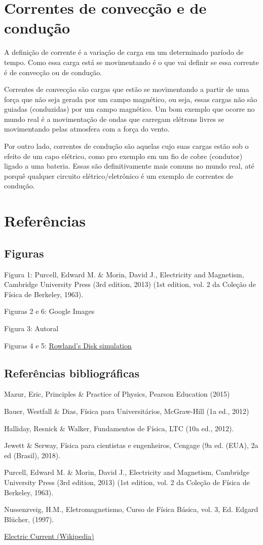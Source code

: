 \documentclass[12pt, letterpaper]{article}
\begin{document}
\newpage
\section{Correntes de convecção e de condução}
    A definição de corrente é a variação de carga em um determinado paríodo de tempo. Como essa carga está se movimentando é o que vai definir se essa corrente é de convecção ou de condução.

    Correntes de convecção são cargas que estão se movimentando a partir de uma força que não seja gerada por um campo magnético, ou seja, essas cargas não são guiadas (conduzidas) por um campo magnético. Um bom exemplo que ocorre no mundo real é a movimentação de ondas que carregam elétrons livres se movimentando pelas atmosfera com a força do vento.

    Por outro lado, correntes de condução são aquelas cujo suas cargas estão sob o efeito de um capo elétrico, como pro exemplo em um fio de cobre (condutor) ligado a uma bateria. Essas são definitivamente mais comuns no mundo real, até porquê qualquer circuito elétrico/eletrônico é um exemplo de correntes de condução.

\newpage
\section{Referências}
    \subsection{Figuras}
    Figura 1: Purcell, Edward M. \& Morin, David J., Electricity and Magnetism, Cambridge University Press (3rd edition, 2013) (1st edition, vol. 2 da Coleção de Física de Berkeley, 1963).

    Figuras 2 e 6: Google Images

    Figura 3: Autoral

    
    Figuras 4 e 5: \href{https://www.edumedia-sciences.com/en/media/108-rowlands-disk}{Rowland's Disk simulation} 

    \subsection{Referências bibliográficas}
    Mazur, Eric, Principles \& Practice of Physics, Pearson Education (2015)

    Bauer, Westfall \& Dias, Física para Universitários, McGraw-Hill  (1a ed., 2012)

    Halliday, Resnick \& Walker, Fundamentos de Física, LTC (10a ed., 2012).

    Jewett \& Serway, Física para cientistas e engenheiros, Cengage (9a ed. (EUA), 2a ed (Brasil), 2018).

    Purcell, Edward M. \& Morin, David J., Electricity and Magnetism, Cambridge University Press (3rd edition, 2013) (1st edition, vol. 2 da Coleção de Física de Berkeley, 1963).

    Nussenzveig, H.M., Eletromagnetismo, Curso de Física Básica, vol. 3, Ed. Edgard Blücher, (1997).

    \href{https://en.wikipedia.org/wiki/Electric_current}{Electric Current (Wikipedia)}
\end{document}

